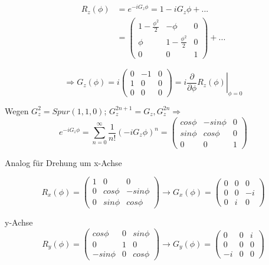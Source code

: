 \begin{align}
R_z(\phi)&=e^{-iG_z\phi}=1-iG_z\phi+...\\
&=\left( 
\begin{array}{ccc}
1-\frac {\phi^2} 2 &  -\phi & 0 \\
\phi & 1-\frac {\phi^2} 2 & 0 \\
0 & 0 & 1
\end{array}
\right) + ...
\end{align}


\[
\Rightarrow G_z(\phi)=i\left( 
\begin{array}{ccc}
0 &  -1 & 0 \\
1 & 0 & 0 \\
0 & 0 & 0
\end{array}
\right)=\left. i\frac \partial {\partial\phi}  R_z(\phi) \right|_{\phi=0}
\]

Wegen \(G_z^2=Spur(1,1,0)\); \(G_z^{2n+1}=G_z,G_z^{2n} \Rightarrow \)
\[
e^{-iG_z\phi}=\sum^\infty_{n=0}\frac 1
{n!}(-iG_z\phi)^n=\left(\begin{array}{ccc}
cos\phi & -sin\phi & 0 \\
sin\phi & cos\phi & 0 \\
0 & 0 & 1
\end{array}\right)
\]

Analog für Drehung um x-Achse

\[
R_x(\phi)=\left( 
\begin{array}{ccc}
1 &  0 & 0 \\
0 & cos\phi & -sin\phi \\
0 & sin\phi & cos\phi
\end{array}
\right) \rightarrow
G_x(\phi)=\left( 
\begin{array}{ccc}
0 &  0 & 0 \\
0 & 0 & -i \\
0 & i & 0
\end{array}
\right)
\]

y-Achse
\[
R_y(\phi)=\left( 
\begin{array}{ccc}
cos\phi &  0 & sin\phi \\
0 & 1 & 0 \\
-sin\phi & 0 & cos\phi
\end{array}
\right) \rightarrow
G_y(\phi)=\left( 
\begin{array}{ccc}
0 &  0 & i  \\
0 & 0 & 0 \\
-i & 0 & 0
\end{array}
\right)
\]

